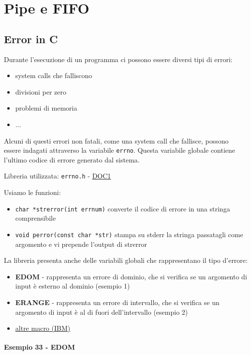 \section{Pipe e FIFO}
    \subsection{Error in C}
    Durante l'esecuzione di un programma ci possono essere diversi tipi di errori: 
    \begin{itemize}
        \item system calls che falliscono
        \item divisioni per zero
        \item problemi di memoria
        \item ...
    \end{itemize}
    Alcuni di questi errori non fatali, come una system call che fallisce, possono essere indagati attraverso la variabile \texttt{errno}. Questa variabile globale contiene l'ultimo codice di errore generato dal sistema. 
    
    Libreria utilizzata: \texttt{errno.h} - \href{https://www.tutorialspoint.com/c_standard_library/errorno_h.htm}{DOC1}
    
    Usiamo le funzioni:
    \begin{itemize}
        \item \texttt{char *strerror(int errnum)} converte il codice di errore in una stringa comprensibile
        \item \texttt{void perror(const char *str)} stampa su stderr la stringa passatagli come argomento e vi prepende l'output di strerror
    \end{itemize}
    
    La libreria presenta anche delle variabili globali che rappresentano il tipo d'errore:
    \begin{itemize}
        \item \textbf{EDOM} - rappresenta un errore di dominio, che si verifica se un argomento di input è esterno al dominio (esempio 1)
        \item \textbf{ERANGE} - rappresenta un errore di intervallo, che si verifica se un argomento di input è al di fuori dell'intervallo (esempio 2)
        \item \href{https://www.ibm.com/docs/en/zos/2.1.0?topic=files-errnoh}{altre macro (IBM)}
    \end{itemize}
 \paragraph{Esempio 33 - EDOM} \hfill \break{}   
 
 

